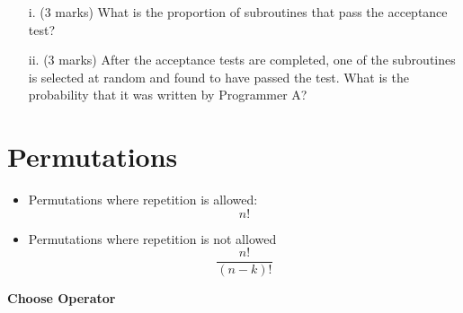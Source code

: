 \documentclass[12pt]{report}
\begin{document}
\begin{itemize}
	\item[i.] (3 marks) What is the proportion of subroutines that pass the acceptance test?
	\item[ii.](3 marks)  After the acceptance tests are completed, one of the subroutines is selected at random and found to have passed the test. What is the probability that it was written by Programmer A?
\end{itemize}

\newpage
		\section{Permutations}
		\Large
		\begin{itemize}
			\item Permutations where repetition is allowed: 
			\[ n! \]
			\item Permutations where repetition is not allowed
			\[ \frac{n!}{(n-k)!} \]
		\end{itemize}
\textbf{\;\;\;Choose Operator}
\end{document}

